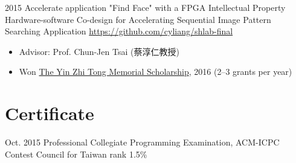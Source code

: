 \documentclass[11pt,a4paper,sans,english]{moderncv}
\begin{document}
    \cventry
        {2015}
        {Accelerate application "Find Face" with a FPGA Intellectual Property}
        {Hardware-software Co-design for Accelerating Sequential Image Pattern Searching Application}
        {}
        {\href{https://github.com/cyliang/shlab-final}{\textnormal{https://github.com/cyliang/shlab-final}}}
        {\begin{itemize}
        \item Advisor: Prof. Chun-Jen Tsai ({蔡淳仁教授})
        \item Won \underline{The Yin Zhi Tong Memorial Scholarship}, 2016 (2--3 grants per year)
        \end{itemize}}

        
        
\section{Certificate}
    \cventry
        {Oct. 2015} %
        {Professional} %
        {Collegiate Programming Examination, ACM-ICPC Contest Council for Taiwan} %
        {}
        {rank 1.5\%} %
        {}

\end{document}
